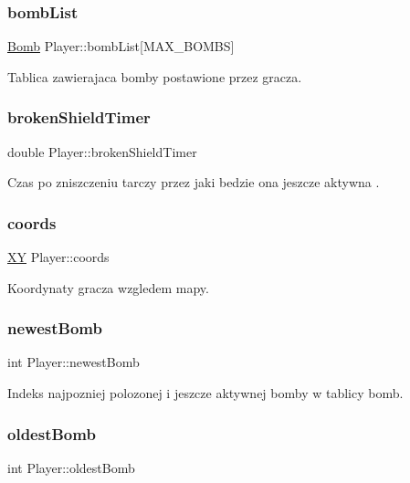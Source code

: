 \subsubsection{\texorpdfstring{bomb\+List}{bombList}}
{\footnotesize\ttfamily \mbox{\hyperlink{struct_bomb}{Bomb}} Player\+::bomb\+List\mbox{[}M\+A\+X\+\_\+\+B\+O\+M\+BS\mbox{]}}

Tablica zawierajaca bomby postawione przez gracza. \mbox{\label{struct_player_aca0817efc57fca8f014e40d2c108f7bb}} 
\subsubsection{\texorpdfstring{broken\+Shield\+Timer}{brokenShieldTimer}}
{\footnotesize\ttfamily double Player\+::broken\+Shield\+Timer}

Czas po zniszczeniu \textquotesingle{}tarczy\textquotesingle{} przez jaki bedzie ona jeszcze aktywna . \mbox{\label{struct_player_a60fad3578d62e8d11e65911337a13244}} 
\subsubsection{\texorpdfstring{coords}{coords}}
{\footnotesize\ttfamily \mbox{\hyperlink{struct_x_y}{XY}} Player\+::coords}

Koordynaty gracza wzgledem mapy. \mbox{\label{struct_player_a4a2fcb0a816a0b9121a5ba00d429c55a}} 
\subsubsection{\texorpdfstring{newest\+Bomb}{newestBomb}}
{\footnotesize\ttfamily int Player\+::newest\+Bomb}

Indeks najpozniej polozonej i jeszcze aktywnej bomby w tablicy bomb. \mbox{\label{struct_player_a284c4526d6934eef1ea29f4aa61ea9e9}} 
\subsubsection{\texorpdfstring{oldest\+Bomb}{oldestBomb}}
{\footnotesize\ttfamily int Player\+::oldest\+Bomb}

